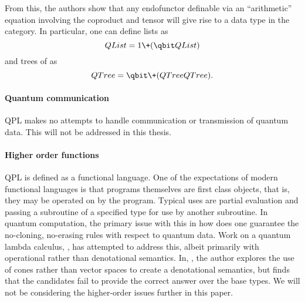 From this, the authors show that any endofunctor definable via an ``arithmetic'' equation involving
the coproduct and tensor will give rise to a data type in the category. In particular, one can
define \qubit lists as \[QList = 1 \+ (\qbit \* QList)\] and trees of \qbits as \[QTree =
\qbit\+(QTree \* QTree).\]

\paragraph{Quantum communication}
QPL makes no attempts to handle communication or transmission of quantum data. This will not be
addressed in this thesis.

\paragraph{Higher order functions}
QPL is defined as a functional language. One of the expectations of modern functional languages is
that programs themselves are first class objects, that is, they may be operated on by the program.
Typical uses are partial evaluation and passing a subroutine of a specified type for use by another
subroutine. In quantum computation, the primary issue with this in how does one guarantee the
no-cloning, no-erasing rules with respect to quantum data. Work on a quantum lambda calculus,
\cite{tonder03:qcsemantics,valiron:thesis}, has attempted to address this, albeit primarily with
operational rather than denotational semantics. In, \cite{selinger04:towardssemantics}, the author
explores the use of cones rather than vector spaces to create a denotational semantics, but finds
that the candidates fail to provide the correct answer over the base types. We will not be
considering the higher-order issues further in this paper.

